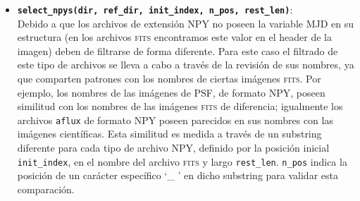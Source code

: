\begin{appendix}
\begin{itemize}
\item \textbf{\texttt{select\_npys(dir, ref\_dir, init\_index, n\_pos, rest\_len)}}:\\
Debido a que los archivos de extensi\'on NPY no poseen la variable MJD en su estructura (en los archivos \textsc{fits} encontramos este valor en el header de la imagen) deben de filtrarse de forma diferente. Para este caso el filtrado de este tipo de archivos se lleva a cabo a trav\'es de la revisi\'on de sus nombres, ya que comparten patrones con los nombres de ciertas im\'agenes \textsc{fits}. Por ejemplo, los nombres de las im\'agenes de PSF, de formato NPY, poseen similitud con los nombres de las im\'agenes \textsc{fits} de diferencia; igualmente los archivos \texttt{aflux} de formato NPY poseen parecidos en sus nombres con las im\'agenes cient\'ificas. Esta similitud es medida a trav\'es de un substring diferente para cada tipo de archivo NPY, definido por la posici\'on inicial \texttt{init\_index}, en el nombre del archivo \textsc{fits} y largo \texttt{rest\_len}. \texttt{n\_pos} indica la posici\'on de un car\'acter espec\'ifico `\_ ' en dicho substring para validar esta comparaci\'on.

\end{itemize}
\pagebreak



\end{appendix}
